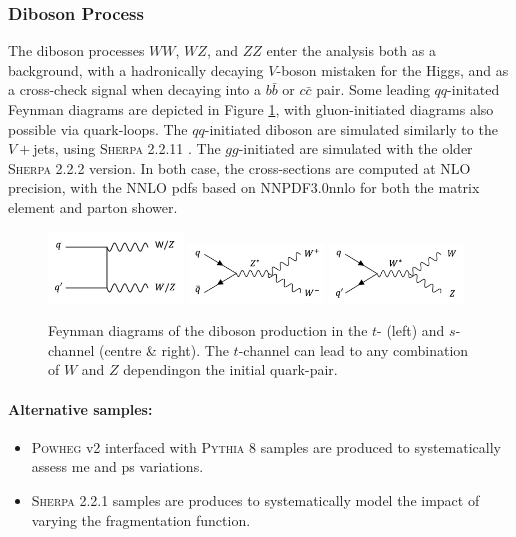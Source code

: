 \subsubsection{Diboson Process}
The diboson processes $WW$, $WZ$, and $ZZ$ enter the analysis both as a background, with a hadronically decaying $V$-boson mistaken for the Higgs, and as a cross-check signal when decaying into a $b\bar{b}$ or $c\bar{c}$ pair. Some leading $qq$-initated Feynman diagrams are depicted in Figure \ref{fig:feyndiV}, with gluon-initiated diagrams also possible via quark-loops. The $qq$-initiated diboson are simulated similarly to the $V+$jets, using \textsc{Sherpa} 2.2.11 \cite{10.21468/SciPostPhys.7.3.034}. The $gg$-initiated are simulated with the older \textsc{Sherpa} 2.2.2 version. In both case, the cross-sections are computed at NLO precision, with the NNLO \gls{pdf}s based on NNPDF3.0nnlo \cite{PDFLHCrun2} for both the matrix element and parton shower.
\begin{figure}[h!]
  \center
  \includegraphics[width=0.32\textwidth]{Images/VH/Feynman/diboson.png}
  \includegraphics[width=0.32\textwidth]{Images/VH/Feynman/diW.png}
  \includegraphics[width=0.32\textwidth]{Images/VH/Feynman/diWZ.png}
  \caption{Feynman diagrams of the diboson production in the $t$- (left) and $s$-channel (centre \& right). The $t$-channel can lead to any combination of $W$ and $Z$ dependingon the initial quark-pair.}
  \label{fig:feyndiV}
\end{figure}

\paragraph{Alternative samples:}
\begin{itemize}
  \item \textsc{Powheg} v2 interfaced with \textsc{Pythia} 8 samples are produced to systematically assess \gls{me} and \gls{ps} variations. 
  \item \textsc{Sherpa} 2.2.1 samples are produces to systematically model the impact of varying the fragmentation function. %
\end{itemize}

